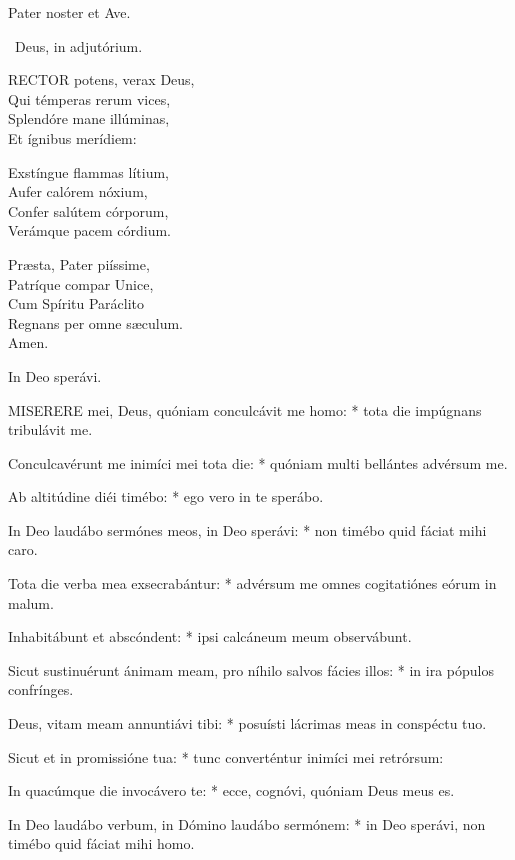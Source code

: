 

Pater noster et Ave.

\V\ Deus, in adjutórium.


\lettrine[lines=2]{R}{ECTOR} potens, verax Deus,\\
Qui témperas rerum vices,\\
Splendóre mane illúminas,\\
Et ígnibus merídiem:

Exstíngue flammas lítium,\\
Aufer calórem nóxium,\\
Confer salútem córporum,\\
Verámque pacem córdium.

Præsta, Pater piíssime,\\
Patríque compar Unice,\\
Cum Spíritu Paráclito\\
Regnans per omne sæculum.\\
Amen.

 In Deo sperávi.


\lettrine[lines=2]{M}{ISERERE} mei, Deus, quóniam conculcávit me homo: * tota die impúgnans tribulávit me.

Conculcavérunt me inimíci mei tota die: * quóniam multi bellántes advérsum me.

Ab altitúdine diéi timébo: * ego vero in te sperábo.

In Deo laudábo sermónes meos, in Deo sperávi: * non timébo quid fáciat mihi caro.

Tota die verba mea exsecrabántur: * advérsum me omnes cogitatiónes eórum in malum.

Inhabitábunt et abscóndent: * ipsi calcáneum meum observábunt.

Sicut sustinuérunt ánimam meam, pro níhilo salvos fácies illos: * in ira pópulos confrínges.

Deus, vitam meam annuntiávi tibi: * posuísti lácrimas meas in conspéctu tuo.

Sicut et in promissióne tua: * tunc converténtur inimíci mei retrórsum:

In quacúmque die invocávero te: * ecce, cognóvi, quóniam Deus meus es.

In Deo laudábo verbum, in Dómino laudábo sermónem: * in Deo sperávi, non timébo quid fáciat mihi homo.

